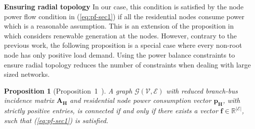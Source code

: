\documentclass[sigconf]{acmart}
\newtheorem{proposition}{\textbf{Proposition}}
\begin{document}
\noindent\textbf{Ensuring radial topology}
In our case, this condition is satisfied by the node power flow condition in (\ref{eq:pf-sec1}) if all the residential nodes consume power which is a reasonable assumption. This is an extension of the proposition in~\cite{manish2019} which considers renewable generation at the nodes. However, contrary to the previous work, the following proposition is a special case where every non-root node has only positive load demand. Using the power balance constraints to ensure radial topology reduces the number of constraints when dealing with large sized networks.
\begin{proposition}[Proposition~1~\cite{manish2019}]
	A graph $\mathcal{G}(\mathcal{V},\mathcal{E})$ with reduced branch-bus incidence matrix $\mathbf{A_H}$ and residential node power consumption vector $\mathbf{p_H}$, with strictly positive entries, is connected if and only if there exists a vector $\mathbf{f}\in\mathbb{R}^{|\mathcal{E}|}$, such that (\ref{eq:pf-sec1}) is satisfied.
	\label{prop-1}
\end{proposition}
\end{document}
